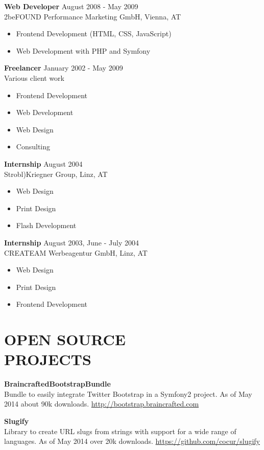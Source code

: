 \documentclass[margin]{res}
\begin{document}
\begin{resume}
\textbf{Web Developer} \hfill August 2008 - May 2009 \\
	2beFOUND Performance Marketing GmbH, Vienna, AT
	\begin{itemize}  \itemsep -2pt
		\item Frontend Development (HTML, CSS, JavaScript)
		\item Web Development with PHP and Symfony
	\end{itemize}

\textbf{Freelancer} \hfill January 2002 - May 2009 \\
	Various client work
	\begin{itemize}  \itemsep -2pt
		\item Frontend Development
		\item Web Development
		\item Web Design
		\item Consulting
	\end{itemize}

\textbf{Internship} \hfill August 2004 \\
	Strobl)Kriegner Group, Linz, AT
	\begin{itemize}  \itemsep -2pt
		\item Web Design
		\item Print Design
		\item Flash Development
	\end{itemize}

\textbf{Internship} \hfill August 2003, June - July 2004 \\
	CREATEAM Werbeagentur GmbH, Linz, AT
	\begin{itemize}  \itemsep -2pt
		\item Web Design
		\item Print Design
		\item Frontend Development
	\end{itemize}

\clearpage

\section{OPEN SOURCE \\ PROJECTS}

\textbf{BraincraftedBootstrapBundle} \\
	Bundle to easily integrate Twitter Bootstrap in a Symfony2 project. As of May 2014 about 90k downloads. \url{http://bootstrap.braincrafted.com}

\textbf{Slugify} \\
	Library to create URL slugs from strings with support for a wide range of languages. As of May 2014 over 20k downloads. \url{https://github.com/cocur/slugify}


\end{resume}
\end{document}
